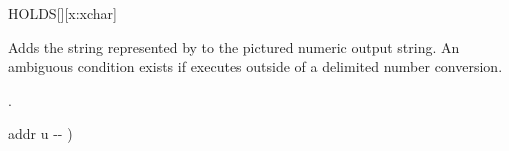 
\begin{worddef}{}{HOLDS}[][x:xchar]
\item {}

	Adds the string represented by  to the pictured numeric
	output string.  An ambiguous condition exists if  executes
	outside of a   delimited number conversion.

\see {}.

	\begin{implement}
	\word{:}   addr u -{}- ) \\
	\tab[0.6]      \word{+}
	    \word{;}
	\end{implement}

	\begin{testing}
	\end{testing}
\end{worddef}


